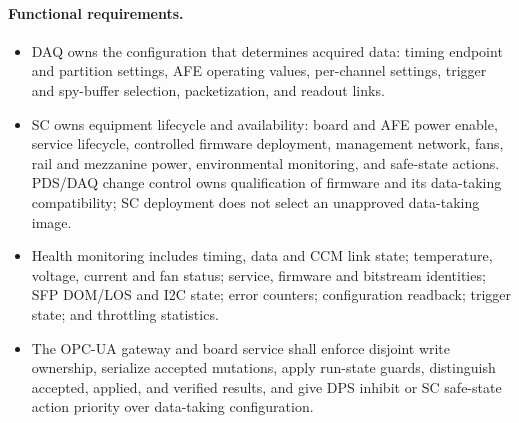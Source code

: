 \paragraph{Functional requirements.}
\begin{itemize}[nosep]
  \item DAQ owns the configuration that determines acquired data: timing endpoint and partition settings, AFE operating values, per-channel settings, trigger and spy-buffer selection, packetization, and readout links.
  \item SC owns equipment lifecycle and availability: board and AFE power enable, service lifecycle, controlled firmware deployment, management network, fans, rail and mezzanine power, environmental monitoring, and safe-state actions. PDS/DAQ change control owns qualification of firmware and its data-taking compatibility; SC deployment does not select an unapproved data-taking image.
  \item Health monitoring includes timing, data and CCM link state; temperature, voltage, current and fan status; service, firmware and bitstream identities; SFP DOM/LOS and I2C state; error counters; configuration readback; trigger state; and throttling statistics.
  \item The OPC-UA gateway and board service shall enforce disjoint write ownership, serialize accepted mutations, apply run-state guards, distinguish accepted, applied, and verified results, and give DPS inhibit or SC safe-state action priority over data-taking configuration.
\end{itemize}
